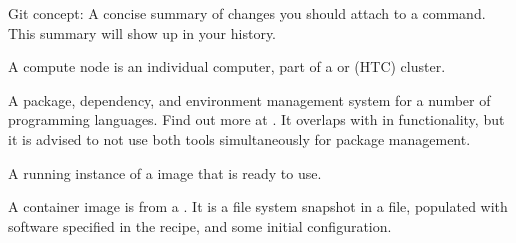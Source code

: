 \begin{description}
\ignorespaces 
\sphinxAtStartPar
Git concept: A concise summary of changes you should attach to a  command. This summary will
show up in your {\hyperref[\detokenize{glossary:term-DataLad-dataset}]{}} history.

\sphinxAtStartPar
A compute node is an individual computer, part of a {\hyperref[\detokenize{glossary:term-high-performance-computing}]{}} or {\hyperref[\detokenize{glossary:term-high-throughput-computing}]{}} (HTC) cluster.

\sphinxAtStartPar
A package, dependency, and environment management system for a number of programming languages.
Find out more at .
It overlaps with {\hyperref[\detokenize{glossary:term-pip}]{}} in functionality, but it is advised to not use both tools simultaneously for package management.

\ignorespaces 
\sphinxAtStartPar
A running instance of a {\hyperref[\detokenize{glossary:term-container-image}]{}} image that is ready to use.

\ignorespaces 
\sphinxAtStartPar
A container image is  from a {\hyperref[\detokenize{glossary:term-container-recipe}]{}}.
It is a file system snapshot in a file, populated with software specified in the recipe, and some initial configuration.


\end{description}

